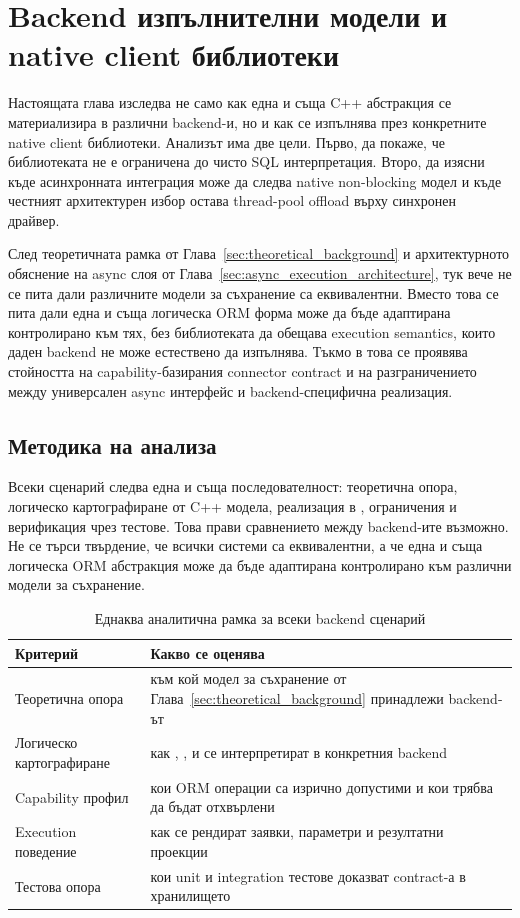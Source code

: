 \section{Backend изпълнителни модели и native client библиотеки}
\label{sec:backend_scenarios}

Настоящата глава изследва не само как една и съща C++ абстракция се материализира в различни backend-и, но и как се изпълнява през конкретните native client библиотеки. Анализът има две цели. Първо, да покаже, че библиотеката не е ограничена до чисто SQL интерпретация. Второ, да изясни къде асинхронната интеграция може да следва native non-blocking модел и къде честният архитектурен избор остава thread-pool offload върху синхронен драйвер.

След теоретичната рамка от Глава~\ref{sec:theoretical_background} и архитектурното обяснение на async слоя от Глава~\ref{sec:async_execution_architecture}, тук вече не се пита дали различните модели за съхранение са еквивалентни. Вместо това се пита дали една и съща логическа ORM форма може да бъде адаптирана контролирано към тях, без библиотеката да обещава execution semantics, които даден backend не може естествено да изпълнява. Тъкмо в това се проявява стойността на capability-базирания connector contract и на разграничението между универсален async интерфейс и backend-специфична реализация.

\subsection{Методика на анализа}

Всеки сценарий следва една и съща последователност: теоретична опора, логическо картографиране от C++ модела, реализация в , ограничения и верификация чрез тестове. Това прави сравнението между backend-ите възможно. Не се търси твърдение, че всички системи са еквивалентни, а че една и съща логическа ORM абстракция може да бъде адаптирана контролирано към различни модели за съхранение.

\begin{table}[H]
\centering
\small
\caption{Еднаква аналитична рамка за всеки backend сценарий}
\label{tab:backend_analysis_frame}
\begin{tabularx}{\textwidth}{L{3.3cm}Y}
\toprule
\textbf{Критерий} & \textbf{Какво се оценява} \\
\midrule
Теоретична опора & към кой модел за съхранение от Глава~\ref{sec:theoretical_background} принадлежи backend-ът \\
Логическо картографиране & как , ,  и  се интерпретират в конкретния backend \\
Capability профил & кои ORM операции са изрично допустими и кои трябва да бъдат отхвърлени \\
Execution поведение & как се рендират заявки, параметри и резултатни проекции \\
Тестова опора & кои unit и integration тестове доказват contract-а в хранилището \\
\bottomrule
\end{tabularx}
\end{table}

